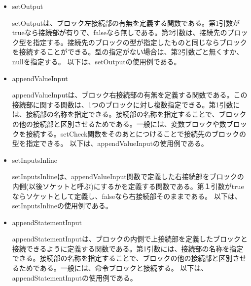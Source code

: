 \documentclass{risepaper}
\begin{document}
\begin{itemize}
\item setOutput

setOutputは、ブロック左接続部の有無を定義する関数である。第1引数がtrueなら接続部が有りで、falseなら無しである。第2引数は、接続先のブロック型を指定する。接続先のブロックの型が指定したものと同じならブロックを接続することができる。型の指定がない場合は、第2引数ごと無くすか、nullを指定する。
以下は、setOutputの使用例である。


\item appendValueInput

appendValueInputは、ブロック右接続部の有無を定義する関数である。この接続部に関する関数は、1つのブロックに対し複数指定できる。第1引数には、接続部の名称を指定できる。接続部の名称を指定することで、ブロックの他の接続部と区別させるためである。一般には、変数ブロックや数ブロックを接続する。setCheck関数をそのあとにつけることで接続先のブロックの型を指定できる。
以下は、appendValueInputの使用例である。


\item setInputsInline

setInputsInlineは、appendValueInput関数で定義した右接続部をブロックの内側(以後ソケットと呼ぶ)にするかを定義する関数である。第１引数がtrueならソケットとして定義し、falseなら右接続部そのままである。
以下は、setInputsInlineの使用例である。


\item appendStatementInput

appendStatementInputは、ブロックの内側で上接続部を定義したブロックと接続できるように定義する関数である。第1引数には、接続部の名称を指定できる。接続部の名称を指定することで、ブロックの他の接続部と区別させるためである。一般には、命令ブロックと接続する。
以下は、appendStatementInputの使用例である。


\end{itemize}
\end{document}
